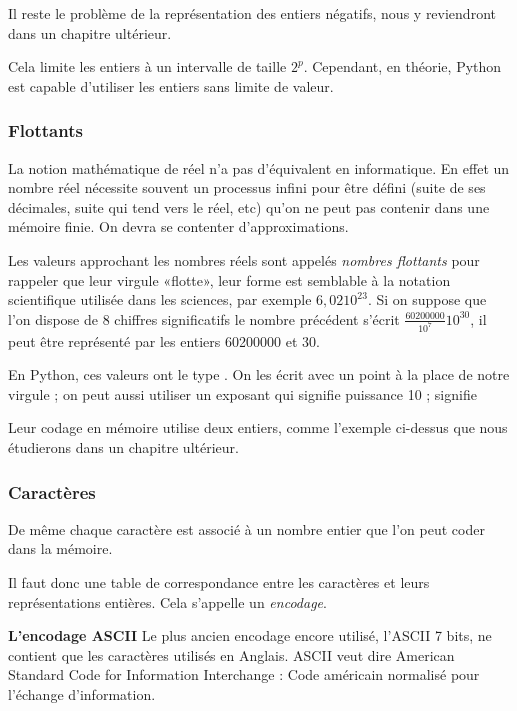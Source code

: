 Il reste le problème de la représentation des entiers négatifs, nous y reviendront dans un chapitre ultérieur.

Cela limite les entiers à un intervalle de taille $2^p$. Cependant, en théorie, Python est capable d'utiliser les entiers sans limite de valeur.
\subsubsection{Flottants}
La notion mathématique de réel n'a pas d'équivalent  en informatique. En effet un nombre réel nécessite souvent un  processus infini pour être défini (suite de ses décimales, suite qui tend vers le réel, etc) qu'on ne peut pas contenir dans une mémoire finie. On devra se contenter d'approximations. 

Les valeurs approchant les nombres réels sont appelés {\it nombres flottants} pour rappeler que leur virgule «flotte», leur forme est semblable à la notation scientifique utilisée dans les sciences, par exemple $6,02 10^23$. 
Si on suppose que l'on dispose de 8 chiffres significatifs le nombre précédent s'écrit $\displaystyle  \frac{60200000}{10^7}10^{30}$, il peut être représenté par les entiers 60200000 et 30.

En Python, ces valeurs ont le type . On les écrit avec un point à la place de notre virgule ; on peut aussi utiliser un exposant  qui signifie puissance 10 ; 
 signifie 

Leur codage en mémoire utilise deux entiers, comme l'exemple ci-dessus que nous étudierons dans un chapitre ultérieur.
\subsubsection{Caractères}
De même chaque caractère est associé à un nombre entier que l'on peut coder dans la mémoire.

Il faut donc une table de correspondance entre les caractères et leurs représentations entières. Cela s'appelle un \emph{encodage}.


{\bf L'encodage ASCII}
Le plus ancien encodage encore utilisé, l'ASCII 7  bits, ne contient que les caractères utilisés en Anglais. ASCII veut dire American Standard Code for Information Interchange : Code américain normalisé pour l'échange d'information.


